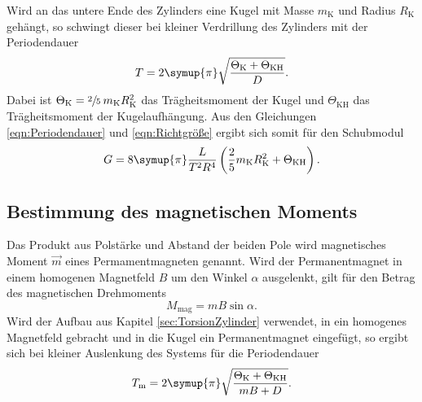 Wird an das untere Ende des Zylinders eine Kugel mit Masse $m_\text{K}$
und Radius $R_\text{K}$
gehängt, so schwingt dieser bei kleiner Verdrillung des Zylinders mit der
Periodendauer
\begin{equation}
    T = 2 \symup{\pi} \sqrt{\frac{\Theta_\text{K} + \Theta_\text{KH}}{D}}.
    \label{eqn:Periodendauer}
\end{equation}
Dabei ist $\Theta_\text{K} = \sfrac{2}{5}\: m_\text{K} R_\text{K}^2$ das
Trägheitsmoment der Kugel und $\Theta_\text{KH}$ das Trägheitsmoment der
Kugelaufhängung. Aus den Gleichungen \eqref{eqn:Periodendauer} und
\eqref{eqn:Richtgröße} ergibt sich somit für den Schubmodul
\begin{equation}
  G = 8 \symup{\pi} \frac{L}{T^2 R^4}
    \left(\frac{2}{5} m_\text{K} R_\text{K}^2 + \Theta_\text{KH}\right).
  \label{eqn:Schubmodul}
\end{equation}

\subsection{Bestimmung des magnetischen Moments}
\label{sec:magTheorie}

Das Produkt aus Polstärke und Abstand der beiden Pole wird magnetisches
Moment $\vec{m}$ eines Permamentmagneten genannt. Wird der Permanentmagnet
in einem homogenen Magnetfeld $B$ um den Winkel $\alpha$ ausgelenkt, gilt für
den Betrag des magnetischen Drehmoments
\begin{equation}
  M_\text{mag} = m B \sin{\alpha}.
\end{equation}
Wird der Aufbau aus Kapitel \ref{sec:TorsionZylinder} verwendet, in ein
homogenes Magnetfeld gebracht und in die Kugel ein Permanentmagnet eingefügt,
so ergibt sich bei kleiner Auslenkung des Systems für die Periodendauer
\begin{equation}
  T_\text{m} = 2 \symup{\pi} \sqrt{\frac{\Theta_\text{K} + \Theta_\text{KH}}{m B + D}}.
  \label{eqn:magPeriode}
\end{equation}
